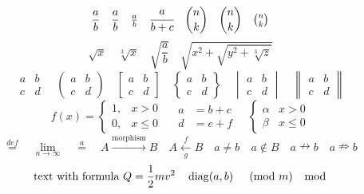 \documentclass{article}
\begin{document}
\[
  \frac{a}{b}\quad \dfrac{a}{b}\quad \tfrac{a}{b}\quad \cfrac{a}{b+c}\quad
  \binom{n}{k}\quad \dbinom{n}{k}\quad \tbinom{n}{k}
\]
\[
  \sqrt{x}\quad \sqrt[3]{x}\quad \sqrt{\dfrac{a}{b}}\quad
  \sqrt{x^{2}+\sqrt{y^{2}+\sqrt[3]{z}}}
\]
\[
  \begin{matrix} a & b \\ c & d \end{matrix}\quad
  \begin{pmatrix} a & b \\ c & d \end{pmatrix}\quad
  \begin{bmatrix} a & b \\ c & d \end{bmatrix}\quad
  \begin{Bmatrix} a & b \\ c & d \end{Bmatrix}\quad
  \begin{vmatrix} a & b \\ c & d \end{vmatrix}\quad
  \begin{Vmatrix} a & b \\ c & d \end{Vmatrix}
\]
\[
  f(x) = \begin{cases} 1, & x > 0 \\ 0, & x \le 0 \end{cases}\quad
  \begin{aligned} a &= b + c \\ d &= e + f \end{aligned}\quad
  \left\{ \begin{array}{ll} \alpha & x>0 \\ \beta & x \le 0 \end{array} \right.
\]
\[
  \overset{def}{=}\quad \underset{n\to\infty}{\lim}\quad \stackrel{a}{=}\quad
  A \xrightarrow{\text{morphism}} B\quad A \xleftarrow[g]{f} B\quad
  a \not= b\quad a \not\in B\quad a \nrightarrow b\quad a \nRightarrow b
\]
\[
  \text{text with formula}\ Q=\frac{1}{2}mv^2\quad
  \operatorname{diag}(a,b)\quad \pmod{m}\quad \bmod
\]
\end{document}
